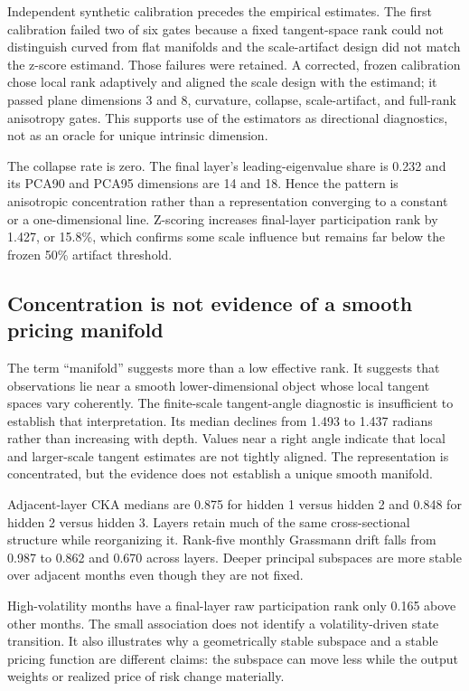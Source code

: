 

Independent synthetic calibration precedes the empirical estimates. The first calibration failed two of six gates because a fixed tangent-space rank could not distinguish curved from flat manifolds and the scale-artifact design did not match the z-score estimand. Those failures were retained. A corrected, frozen calibration chose local rank adaptively and aligned the scale design with the estimand; it passed plane dimensions 3 and 8, curvature, collapse, scale-artifact, and full-rank anisotropy gates. This supports use of the estimators as directional diagnostics, not as an oracle for unique intrinsic dimension.

The collapse rate is zero. The final layer's leading-eigenvalue share is 0.232 and its PCA90 and PCA95 dimensions are 14 and 18. Hence the pattern is anisotropic concentration rather than a representation converging to a constant or a one-dimensional line. Z-scoring increases final-layer participation rank by 1.427, or 15.8\%, which confirms some scale influence but remains far below the frozen 50\% artifact threshold.

\subsection{Concentration is not evidence of a smooth pricing manifold}

The term ``manifold'' suggests more than a low effective rank. It suggests that observations lie near a smooth lower-dimensional object whose local tangent spaces vary coherently. The finite-scale tangent-angle diagnostic is insufficient to establish that interpretation. Its median declines from 1.493 to 1.437 radians rather than increasing with depth. Values near a right angle indicate that local and larger-scale tangent estimates are not tightly aligned. The representation is concentrated, but the evidence does not establish a unique smooth manifold.

Adjacent-layer CKA medians are 0.875 for hidden 1 versus hidden 2 and 0.848 for hidden 2 versus hidden 3. Layers retain much of the same cross-sectional structure while reorganizing it. Rank-five monthly Grassmann drift falls from 0.987 to 0.862 and 0.670 across layers. Deeper principal subspaces are more stable over adjacent months even though they are not fixed.

High-volatility months have a final-layer raw participation rank only 0.165 above other months. The small association does not identify a volatility-driven state transition. It also illustrates why a geometrically stable subspace and a stable pricing function are different claims: the subspace can move less while the output weights or realized price of risk change materially.

